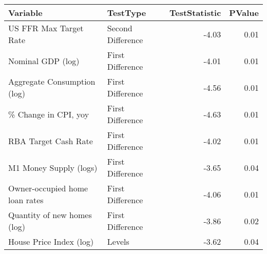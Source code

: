\begin{table}[ht]
\centering
\begin{tabular}{llrr}
  \hline
Variable & TestType & TestStatistic & PValue \\ 
  \hline
US FFR Max Target Rate & Second Difference & -4.03 & 0.01 \\ 
  Nominal GDP (log) & First Difference & -4.01 & 0.01 \\ 
  Aggregate Consumption (log) & First Difference & -4.56 & 0.01 \\ 
  \% Change in CPI, yoy & First Difference & -4.63 & 0.01 \\ 
  RBA Target Cash Rate & First Difference & -4.02 & 0.01 \\ 
  M1 Money Supply (logs) & First Difference & -3.65 & 0.04 \\ 
  Owner-occupied home loan rates & First Difference & -4.06 & 0.01 \\ 
  Quantity of new homes (log) & First Difference & -3.86 & 0.02 \\ 
  House Price Index (log) & Levels & -3.62 & 0.04 \\ 
   \hline
\end{tabular}
\end{table}
